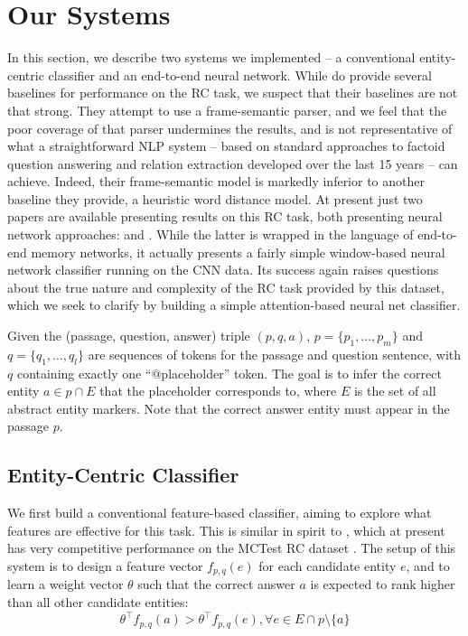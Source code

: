 \section{Our Systems}

In this section, we describe two systems we implemented -- a conventional entity-centric classifier and an end-to-end neural network. While  do provide several baselines for performance on the RC task, we suspect that their baselines are not that strong. They attempt to use a frame-semantic parser, and we feel that the poor coverage of that parser undermines the results, and is not representative of what a straightforward NLP system -- based on standard approaches to factoid question answering and relation extraction developed over the last 15 years -- can achieve. Indeed, their frame-semantic model is markedly inferior to another baseline they provide, a heuristic word distance model. At present just two papers are available presenting results on this RC task, both presenting neural network approaches: \cite{hermann2015teaching} and \cite{hill2016goldilocks}. While the latter is wrapped in the language of end-to-end memory networks, it actually presents a fairly simple window-based neural network classifier running on the CNN data. Its success again raises questions about the true nature and complexity of the RC task provided by this dataset, which we seek to clarify by building a simple attention-based neural net classifier.

Given the (passage, question, answer) triple $(p, q, a)$, $p = \{p_1, \ldots, p_{m}\}$ and $q = \{q_1, \ldots, q_{l}\}$ are sequences of tokens for the passage and question sentence, with $q$ containing exactly one ``@placeholder'' token. The goal is to infer the correct entity $a \in p \cap E$ that the placeholder corresponds to, where $E$ is the set of all abstract entity markers. Note that the correct answer entity must appear in the passage $p$.

\subsection{Entity-Centric Classifier}

We first build a conventional feature-based classifier, aiming to explore what features are effective for this task. This is similar in spirit to \cite{wang2015machine}, which at present has very competitive performance on the MCTest RC dataset \cite{richardson2013mctest}. The setup of this system is to design a feature vector $f_{p, q}(e)$ for each candidate entity $e$, and to learn a weight vector $\theta$ such that the correct answer $a$ is expected to rank higher than all other candidate entities:
\begin{equation}
\theta^{\intercal}f_{p, q}(a) > \theta^{\intercal}f_{p, q}(e), \forall e \in E \cap p \setminus \{a\}
\end{equation}

